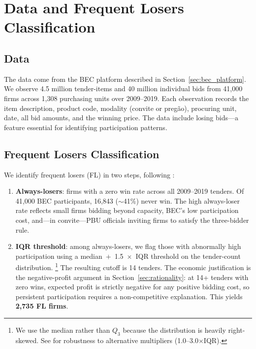 \section{Data and Frequent Losers Classification}
\label{sec:data}

\subsection{Data}
\label{sec:data_source}

The data come from the BEC platform described in
Section~\ref{sec:bec_platform}. We observe 4.5 million tender-items
and 40 million individual bids from 41,000 firms across 1,308
purchasing units over 2009--2019. Each observation records the item
description, product code, modality (convite or preg\~ao), procuring
unit, date, all bid amounts, and the winning price. The data include
losing bids---a feature essential for identifying participation
patterns.

\subsection{Frequent Losers Classification}
\label{sec:fl_definition}

We identify frequent losers (FL) in two steps, following
\citet{genicolomartins2026screening}:

\begin{enumerate}
  \item \textbf{Always-losers}: firms with a zero win rate across all
    2009--2019 tenders. Of 41,000 BEC participants, 16,843 ($\sim$41\%)
    never win. The high always-loser rate reflects small firms bidding
    beyond capacity, BEC's low participation cost, and---in
    convite---PBU officials inviting firms to satisfy the three-bidder
    rule.

  \item \textbf{IQR threshold}: among always-losers, we flag those
    with abnormally high participation using a
    median~$+$~1.5~$\times$~IQR threshold on the tender-count
    distribution.%
    \footnote{We use the median rather than $Q_3$ because the
    distribution is heavily right-skewed. See
    \citet{genicolomartins2026screening} for robustness to
    alternative multipliers (1.0--3.0$\times$IQR).}
    The resulting cutoff is 14 tenders. The economic justification
    is the negative-profit argument in Section~\ref{sec:rationality}:
    at 14+ tenders with zero wins, expected profit is strictly
    negative for any positive bidding cost, so persistent
    participation requires a non-competitive explanation.
    This yields \textbf{2,735 FL firms}.
\end{enumerate}

